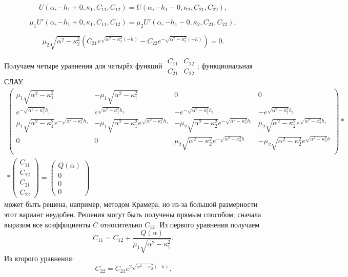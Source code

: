 \documentclass[a4paper, 12pt]{article}
\newcommand{\m}[1]{\mu_{#1}}
\newcommand{\sig}[1]{\sqrt{\alpha^2-\kappa_#1^2}}
\begin{document}
    \begin{equation}
    U(\alpha,-h_1+0,\kappa_1,C_{11},C_{12}) = U(\alpha,-h_1-0,\kappa_2,C_{21},C_{22}),
    \end{equation}

    \begin{equation}
    \mu_1 U'(\alpha,-h_1+0,\kappa_1,C_{11},C_{12}) =\mu_2 U'(\alpha,-h_1-0,\kappa_2,C_{21},C_{22}),
    \end{equation}

    \begin{equation}
    \mu_2 \sqrt{\alpha^2-\kappa_2^2} (C_{21} e^{\sqrt{\alpha^2-\kappa_2^2}(-h)}-C_{22}e^{-\sqrt{\alpha^2-\kappa_2^2}(-h)})=0 .
    \end{equation}

Получаем четыре уравнения для четырёх функций $\begin{matrix} C_{11} & C_{12} \\ C_{21} & C_{22} \end{matrix}$; функциональная СЛАУ
\begin{multline}
  \begin{pmatrix} 
\m{1}\sig{1} & -\m{1}\sig{1} & 0 & 0 \\
e^{-\sig{1}h_1} & e^{\sig{1}h_1} & -e^{-\sig{2}h_1} & -e^{\sig{2}h_1}\\
\m{1}\sig{1}e^{-\sig{1}h_1} & -\m{1}\sig{1}e^{\sig{1}h_1} & -\m{2}\sig{2}e^{-\sig{2}h_1} & \m{2}\sig{2}e^{\sig{2}h_1}\\
0 & 0 & \m{2}\sig{2}e^{-\sig{2}h} & -\m{2}\sig{2}e^{\sig{2}h}\\
\end{pmatrix}*\\
*\begin{pmatrix} C_{11} \\ C_{12} \\ C_{21} \\ C_{22} \end{pmatrix}=\begin{pmatrix} Q(\alpha) \\ 0 \\ 0 \\ 0 \end{pmatrix}  
\end{multline}
может быть решена, например, методом Крамера, но из-за большой размерности этот вариант неудобен. Решения могут быть получены прямым способом; сначала выразим все коэффициенты $C$ относительно $C_{12}$. Из первого уравнения получаем 
$$C_{11}=C_{12}+\frac{Q(\alpha)}{\mu_1 \sqrt{\alpha^2-\kappa_1^2}}.$$
Из второго уравнения:
$$C_{22}=C_{21} e^{2\sqrt{\alpha^2-\kappa_2^2}(-h)}.$$
\end{document}
